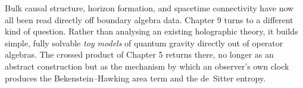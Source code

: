 \bigskip
\noindent Bulk causal structure, horizon formation, and spacetime connectivity have now all been read directly
off boundary algebra data. Chapter 9 turns to a different kind of question. Rather than analysing an existing
holographic theory, it builds simple, fully solvable \emph{toy models} of quantum gravity directly out of
operator algebras. The crossed product of Chapter 5 returns there, no longer as an abstract construction but
as the mechanism by which an observer's own clock produces the Bekenstein--Hawking area term and the
de~Sitter entropy.
